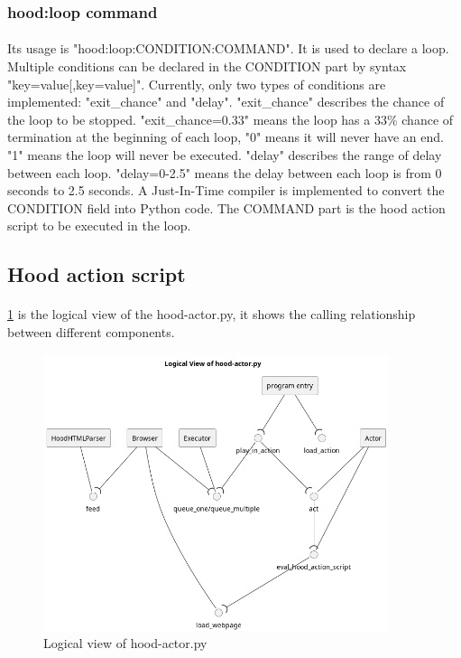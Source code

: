 \documentclass[mscthesis]{usiinfthesis}
\begin{document}
\subsubsection{hood:loop command}
\paragraph{}
Its usage is "hood:loop:CONDITION:COMMAND". It is used to declare a loop. Multiple conditions can be declared in the CONDITION part by syntax "key=value[,key=value]". Currently, only two types of conditions are implemented: "exit\_chance" and "delay". "exit\_chance" describes the chance of the loop to be stopped. "exit\_chance=0.33" means the loop has a 33\% chance of termination at the beginning of each loop, "0" means it will never have an end. "1" means the loop will never be executed. "delay" describes the range of delay between each loop. "delay=0-2.5" means the delay between each loop is from 0 seconds to 2.5 seconds. A Just-In-Time compiler is implemented to convert the CONDITION field into Python code. The COMMAND part is the hood action script to be executed in the loop.

\subsection{Hood action script}
\paragraph{}
\cref{fig:actor-logic-view} is the logical view of the hood-actor.py, it shows the calling relationship between different components.
\begin{figure}[H]
  \includegraphics[width=0.9\textwidth]{graphics/puml/actor.png}
  \caption{Logical view of hood-actor.py}
  \label{fig:actor-logic-view}
\end{figure}
\end{document}
